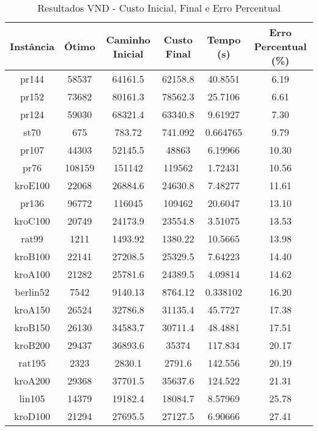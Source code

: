 \documentclass[10pt]{extarticle} %
\begin{document}
\begin{table}[h]
    \centering
    \begin{tabular}{|c|c|c|c|c|c|} \hline 
         \textbf{Instância} & \textbf{Ótimo} & \textbf{Caminho Inicial} & \textbf{Custo Final} & \textbf{Tempo (s)} & \textbf{Erro Percentual (\%)} \\ \hline 
         pr144      & 58537    & 64161.5      & 62158.8    & 40.8551   & 6.19  \\ \hline
         pr152      & 73682    & 80161.3      & 78562.3    & 25.7106   & 6.61  \\ \hline
         pr124      & 59030    & 68321.4      & 63340.8    & 9.61927   & 7.30  \\ \hline
         st70       & 675      & 783.72       & 741.092    & 0.664765  & 9.79  \\ \hline
         pr107      & 44303    & 52145.5      & 48863      & 6.19966   & 10.30 \\ \hline
         pr76       & 108159   & 151142       & 119562     & 1.72431   & 10.56 \\ \hline
         kroE100    & 22068    & 26884.6      & 24630.8    & 7.48277   & 11.61 \\ \hline
         pr136      & 96772    & 116045       & 109462     & 20.6047   & 13.10 \\ \hline
         kroC100    & 20749    & 24173.9      & 23554.8    & 3.51075   & 13.53 \\ \hline
         rat99      & 1211     & 1493.92      & 1380.22    & 10.5665   & 13.98 \\ \hline
         kroB100    & 22141    & 27208.5      & 25329.5    & 7.64223   & 14.40 \\ \hline
         kroA100    & 21282    & 25781.6      & 24389.5    & 4.09814   & 14.62 \\ \hline
         berlin52   & 7542     & 9140.13      & 8764.12    & 0.338102  & 16.20 \\ \hline
         kroA150    & 26524    & 32786.8      & 31135.4    & 45.7727   & 17.38 \\ \hline
         kroB150    & 26130    & 34583.7      & 30711.4    & 48.4881   & 17.51 \\ \hline
         kroB200    & 29437    & 36893.6      & 35374      & 117.834   & 20.17 \\ \hline
         rat195     & 2323     & 2830.1       & 2791.6     & 142.556   & 20.19 \\ \hline
         kroA200    & 29368    & 37701.5      & 35637.6    & 124.522   & 21.31 \\ \hline
         lin105     & 14379    & 19182.4      & 18084.7    & 8.57969   & 25.78 \\ \hline
         kroD100    & 21294    & 27695.5      & 27127.5    & 6.90666   & 27.41 \\ \hline
    \end{tabular}
    \caption{Resultados VND - Custo Inicial, Final e Erro Percentual}
    \label{tab:comparison_with_initial}
\end{table}
\end{document}
